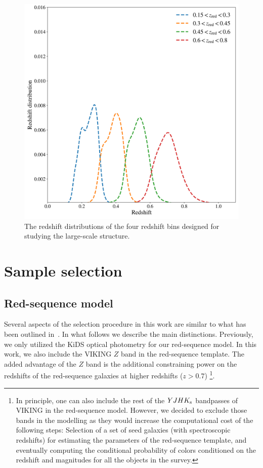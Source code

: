 \documentclass[fleqn,usenatbib,useAMS]{mnras}
\begin{document}
\begin{figure}
    \includegraphics[width = \columnwidth]{figures_tmp/nzs.png}
    \caption{The redshift distributions of the four redshift bins designed for studying the large-scale structure.}
    \label{fig:nzs}
\end{figure}

\section{Sample selection}\label{sec:selection}

\subsection{Red-sequence model}

Several aspects of the selection procedure in this work are similar to what has been outlined  in~\citet{vakili2019}. In what follows we describe the main distinctions. Previously, we only utilized the KiDS optical photometry for our red-sequence model. In this work, we also include the VIKING $Z$ band in the red-sequence template.
The added advantage of the $Z$ band is the additional constraining power on the redshifts of the red-sequence galaxies at higher redshifts ($z>0.7$)
\footnote{In principle, one can also include the rest of the $YJHK_{\rm s}$ bandpasses of VIKING in the red-sequence model. However, we decided to exclude those bands in the modelling as they would increase the computational cost of the following steps: Selection of a set of seed galaxies (with spectroscopic redshifts) for estimating the parameters of the red-sequence template, and eventually computing the conditional probability of colors conditioned on the redshift and magnitudes for all the objects in the survey.}.
\end{document}
